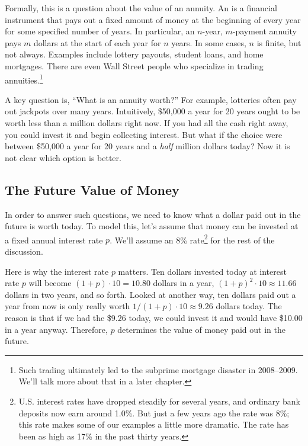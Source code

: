 Formally, this is a question about the value of an annuity.  An
 is a financial instrument that pays out a fixed amount
of money at the beginning of every year for some specified number of
years.  In particular, an $n$-year, $m$-payment annuity pays $m$
dollars at the start of each year for $n$ years.  In some cases, $n$
is finite, but not always.  Examples include lottery payouts, student
loans, and home mortgages.  There are even Wall Street people who
specialize in trading annuities.\footnote{Such trading ultimately led
  to the subprime mortgage disaster in 2008--2009.  We'll talk more
  about that in a later chapter.} \iffalse Chapter~\ref{sec:subprime}\fi

A key question is, ``What is an annuity worth?''  For example,
lotteries often pay out jackpots over many years.  Intuitively,
\$50,000 a year for 20 years ought to be worth less than a million
dollars right now.  If you had all the cash right away, you could
invest it and begin collecting interest.  But what if the choice were
between \$50,000 a year for 20 years and a \emph{half} million
dollars today?  Now it is not clear which option is better.

\subsection{The Future Value of Money}

In order to answer such questions, we need to know what a dollar paid out
in the future is worth today.  To model this, let's assume that money can
be invested at a fixed annual interest rate $p$.  We'll assume an 8\%
rate\footnote{U.S. interest rates have dropped steadily for several years,
  and ordinary bank deposits now earn around 1.0\%.  But just a few years
  ago the rate was 8\%; this rate makes some of our examples a little more
  dramatic.  The rate has been as high as 17\% in the past thirty
  years.}  for
the rest of the discussion.

Here is why the interest rate $p$ matters.  Ten dollars invested today
at interest rate $p$ will become $(1+p)\cdot 10 = 10.80$ dollars in a
year, $(1+p)^2\cdot 10 \approx 11.66$ dollars in two years, and so
forth.  Looked at another way, ten dollars paid out a year from now is
only really worth $1/(1+p) \cdot 10 \approx 9.26$ dollars today.  The
reason is that if we had the \$9.26 today, we could invest it and
would have \$10.00 in a year anyway.  Therefore, $p$ determines the
value of money paid out in the future.

